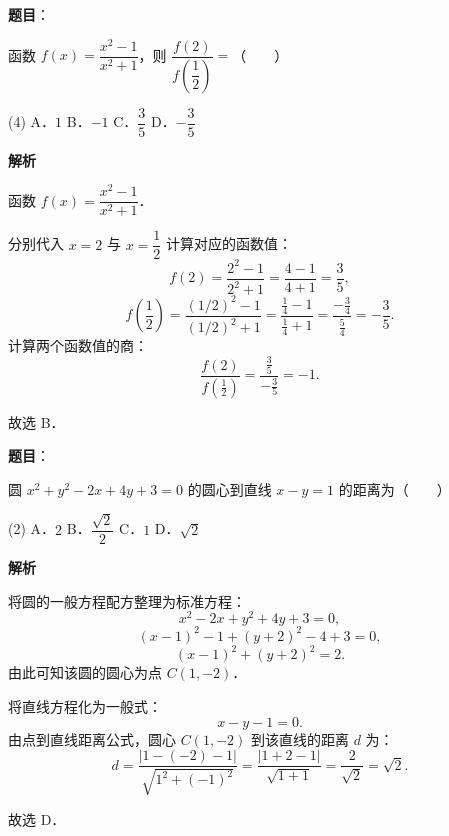 \begin{answer}

\textbf{题目}：

函数 $f(x) = \dfrac{x^2 - 1}{x^2 + 1}$，则 $\dfrac{f(2)}{f\left(\dfrac{1}{2}\right)} =$\mbox{（　　）}

\begin{gkopts}(4)
\task A．$1$
\task B．$-1$
\task C．$\dfrac{3}{5}$
\task D．$-\dfrac{3}{5}$
\end{gkopts}

\textbf{解析}

函数 $f(x) = \dfrac{x^2 - 1}{x^2 + 1}$．

分别代入 $x = 2$ 与 $x = \dfrac{1}{2}$ 计算对应的函数值：
\nopagebreak[4]
\[
f(2) = \frac{2^2 - 1}{2^2 + 1} = \frac{4 - 1}{4 + 1} = \frac{3}{5},
\]
\nopagebreak[4]
\[
f\left(\frac{1}{2}\right) = \frac{(1/2)^2 - 1}{(1/2)^2 + 1} = \frac{\frac{1}{4} - 1}{\frac{1}{4} + 1} = \frac{-\frac{3}{4}}{\frac{5}{4}} = -\frac{3}{5}.
\]
计算两个函数值的商：
\nopagebreak[4]
\[
\frac{f(2)}{f\left(\frac{1}{2}\right)} = \frac{\frac{3}{5}}{-\frac{3}{5}} = -1.
\]

故选 B．


\end{answer}
\begin{answer}

\textbf{题目}：

圆 $x^2 + y^2 - 2x + 4y + 3 = 0$ 的圆心到直线 $x - y = 1$ 的距离为\mbox{（　　）}

\begin{gkopts}(2)
\task A．$2$
\task B．$\dfrac{\sqrt{2}}{2}$
\task C．$1$
\task D．$\sqrt{2}$
\end{gkopts}

\textbf{解析}

将圆的一般方程配方整理为标准方程：
\nopagebreak[4]
\[
x^2 - 2x + y^2 + 4y + 3 = 0,
\]
\nopagebreak[4]
\[
(x - 1)^2 - 1 + (y + 2)^2 - 4 + 3 = 0,
\]
\nopagebreak[4]
\[
(x - 1)^2 + (y + 2)^2 = 2.
\]
由此可知该圆的圆心为点 $C(1, -2)$．

将直线方程化为一般式：
\nopagebreak[4]
\[
x - y - 1 = 0.
\]
由点到直线距离公式，圆心 $C(1, -2)$ 到该直线的距离 $d$ 为：
\nopagebreak[4]
\[
d = \frac{|1 - (-2) - 1|}{\sqrt{1^2 + (-1)^2}} = \frac{|1 + 2 - 1|}{\sqrt{1 + 1}} = \frac{2}{\sqrt{2}} = \sqrt{2}.
\]

故选 D．


\end{answer}
